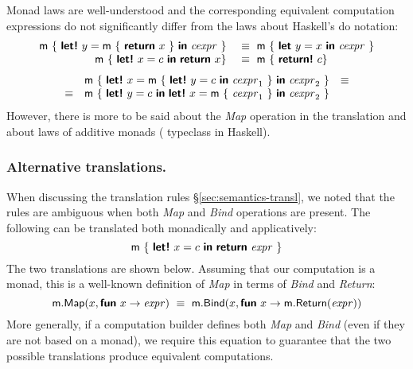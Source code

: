 \documentclass[runningheads,a4paper]{llncs}
\begin{document}
Monad laws are well-understood and the corresponding equivalent computation expressions do
not significantly differ from the laws about Haskell's do notation:
%
\begin{equation*}
\begin{array}{rl}
\ident{m}~\{~ \kvd{let!}~y=\ident{m}~\{~\kvd{return}~x~\}~\kvd{in}~\cexpr~ \}
&~\equiv~ \ident{m}~\{~ \kvd{let}~y=x~\kvd{in}~\cexpr~ \}
\\
\ident{m}~\{~ \kvd{let!}~x=c~\kvd{in}~\kvd{return}~x \}
&~\equiv~ \ident{m}~\{~ \kvd{return!}~c \}
\end{array}
\end{equation*}
\begin{equation*}
\begin{array}{rcl}
      &\ident{m}~\{~ \kvd{let!}~x=\ident{m}~\{~\kvd{let!}~y=c~\kvd{in}~\cexpr_1~\}~\kvd{in}~\cexpr_2~\}&\equiv\\
\equiv&\ident{m}~\{~ \kvd{let!}~y=c~\kvd{in}~\kvd{let!}~x=\ident{m}~\{~\cexpr_1~\}~\kvd{in}~\cexpr_2~\}\\
\end{array}
\end{equation*}
%
However, there is more to be said about the \emph{Map} operation in the translation and
about laws of additive monads ( typeclass in Haskell).

\vspace{-1em}
\subsubsection{Alternative translations.} When discussing the translation rules 
\S\ref{sec:semantics-transl}, we noted that the rules are ambiguous when both \emph{Map} and
\emph{Bind} operations are present. The following can be translated both monadically and 
applicatively:
%
\begin{equation*}
\ident{m}~\{~\kvd{let!}~x = c~\kvd{in}~\kvd{return}~\expr~\}\\
\end{equation*}
%
The two translations are shown below. Assuming that our computation is a monad,
this is a well-known definition of \emph{Map} in terms of \emph{Bind} and \emph{Return}:
%
\begin{equation*}
\textnormal{\sffamily m}.\textnormal{\sffamily Map}(x, \textnormal{\bfseries\sffamily fun}~x \rightarrow \textnormal{\emph{expr}}) ~\equiv~
  \textnormal{\sffamily m}.\textnormal{\sffamily Bind}(x, \textnormal{\bfseries\sffamily fun}~x \rightarrow \textnormal{\sffamily m}.\textnormal{\sffamily Return}(\textnormal{\emph{expr}}))\\
\end{equation*}
%
More generally, if a computation builder defines both \emph{Map} and \emph{Bind} (even if they are
not based on a monad), we require this equation to guarantee that the two possible translations 
produce equivalent computations.
\end{document}
